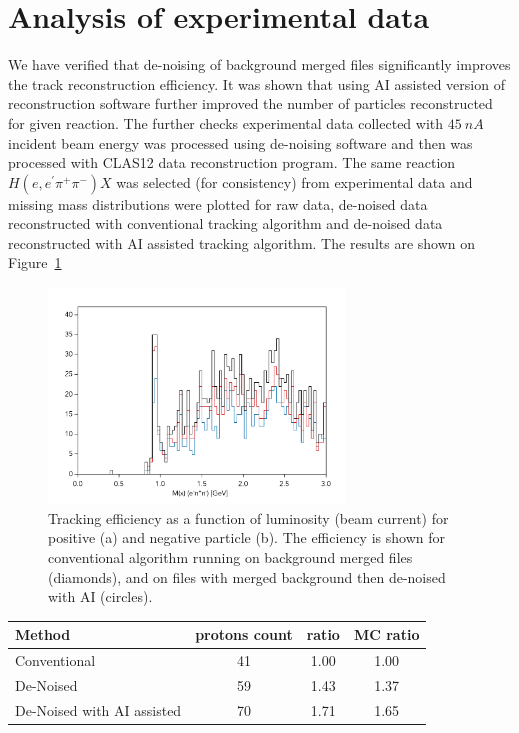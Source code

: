 \section{Analysis of experimental data}

We have verified that de-noising of background merged files significantly improves the track reconstruction efficiency.
It was shown that using AI assisted version of reconstruction software further improved the number of particles reconstructed for given reaction. 
The further checks experimental data collected with $45~nA$ incident beam energy was processed using de-noising software and then was processed with CLAS12 data reconstruction program. The same reaction $H(e,e^\prime\pi^+\pi^-)X$ was selected (for consistency) from experimental data and missing mass distributions were plotted for raw data, de-noised data reconstructed with conventional tracking algorithm and de-noised data reconstructed with AI assisted tracking algorithm.
The results are shown on Figure~\ref{denoise:exp_data}


\begin{figure}[!h]
\begin{center}
 \includegraphics[width=3.1in]{images/figure_denoise_expdata.pdf}
\caption {Tracking efficiency as a function of luminosity (beam current) for positive (a) and negative particle (b).  The efficiency is shown for
conventional algorithm running on background merged files (diamonds), and on files with merged background then de-noised with AI (circles).}
 \label{denoise:exp_data}
 \end{center}
\end{figure}


\begin{table}[!h]
\begin{center}
\begin{tabular}{lccc}
Method & protons count & ratio &  MC ratio \\
\hline
Conventional & 41 & 1.00 & 1.00 \\
De-Noised & 59 & 1.43 & 1.37 \\
De-Noised with AI assisted & 70 & 1.71 &1.65 \\
\hline
\end{tabular}
\end{center}
\end{table}


